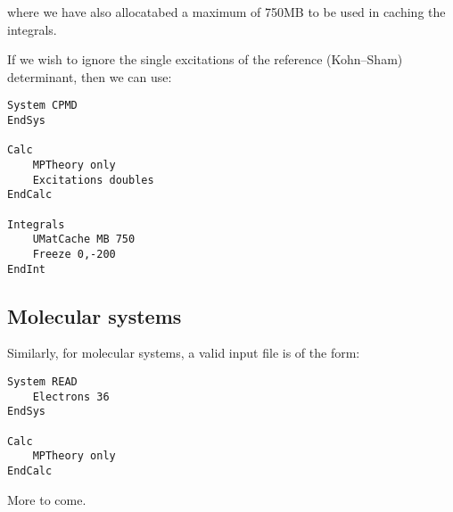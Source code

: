 \documentclass[openany,a4paper,10pt]{manual}
\begin{document}
where we have also allocatabed a maximum of 750MB to be used in caching the integrals.

If we wish to ignore the single excitations of the reference (Kohn--Sham) determinant, then we can use:

\begin{Verbatim}[commandchars=@\[\]]
System CPMD
EndSys

Calc
    MPTheory only
    Excitations doubles
EndCalc

Integrals
    UMatCache MB 750
    Freeze 0,-200
EndInt
\end{Verbatim}


\subsection{Molecular systems}

Similarly, for molecular systems, a valid input file is of the form:

\begin{Verbatim}[commandchars=@\[\]]
System READ
    Electrons 36
EndSys

Calc
    MPTheory only
EndCalc
\end{Verbatim}

More to come.
\end{document}
